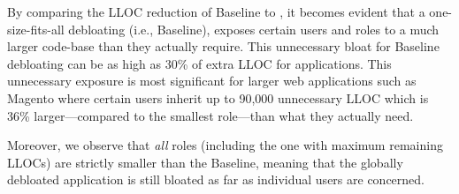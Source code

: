 By comparing the LLOC reduction of Baseline to \dbltr{}, it becomes evident that a one-size-fits-all debloating (i.e., Baseline), exposes certain users and roles to a much larger code-base than they actually require. 
This unnecessary bloat for Baseline debloating can be as high as 30\% of extra LLOC for applications.  
This unnecessary exposure is most significant for larger web applications such as Magento where certain users inherit up to 90,000 unnecessary LLOC which is 36\% larger---compared to the smallest \dbltr{} role---than what they actually need. 

Moreover, we observe that \emph{all} \dbltr{} roles (including the one with maximum remaining LLOCs) are strictly smaller than the Baseline, meaning that the globally debloated application is still bloated as far as individual users are concerned. 

